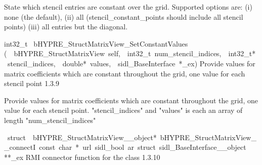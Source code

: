 \documentclass{article}
\begin{document}
\begin{cxxentry}
\begin{cxxentry}
\begin{cxxfunction}
\begin{cxxdoc}
State which stencil entries are constant over the grid.
Supported options are: (i) none (the default),
(ii) all (stencil\_constant\_points should include all stencil points)
(iii) all entries but the diagonal. 
\end{cxxdoc}
\end{cxxfunction}
\begin{cxxfunction}
{int32\_t\ }
        {bHYPRE\_StructMatrixView\_SetConstantValues}
        {(\ \ bHYPRE\_StructMatrixView\ self,\ \ int32\_t\ num\_stencil\_indices,\ \ int32\_t*\ stencil\_indices,\ \ double*\ values,\ \ sidl\_BaseInterface\ *\_ex)}
        {
Provide values for matrix coefficients which are constant throughout
the grid, one value for each stencil point}
        {1.3.9}
\begin{cxxdoc}

Provide values for matrix coefficients which are constant throughout
the grid, one value for each stencil point.
"stencil\_indices" and "values" is each an array of length
"num\_stencil\_indices" 
\end{cxxdoc}
\end{cxxfunction}
\begin{cxxvariable}
{\ struct\ \ bHYPRE\_StructMatrixView\_\_object*\ bHYPRE\_StructMatrixView\_\_connectI\ const\ char\ *\ url\ sidl\_bool\ ar\ struct\ sidl\_BaseInterface\_\_object}
        {**\_ex}
        {}
        {
RMI connector function for the class}
        {1.3.10}
\begin{cxxdoc}


\end{cxxdoc}
\end{cxxvariable}
\end{cxxentry}
\end{cxxentry}
\end{document}
